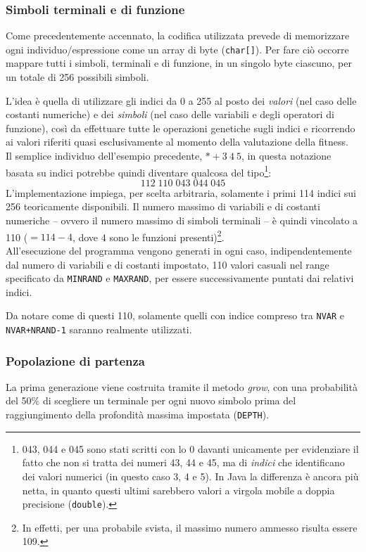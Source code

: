 \documentclass{../llncs}
\newcommand{\java}{\textsf{Java}\xspace}
\begin{document}
\subsubsection{Simboli terminali e di funzione}
Come precedentemente accennato, la codifica utilizzata prevede di memorizzare ogni individuo/espressione come un array di byte (\texttt{char[]}). Per fare ciò occorre mappare tutti i simboli, terminali e di funzione, in un singolo byte ciascuno, per un totale di 256 possibili simboli.

L'idea è quella di utilizzare gli indici da 0 a 255 al posto dei \emph{valori} (nel caso delle costanti numeriche) e dei \emph{simboli} (nel caso delle variabili e degli operatori di funzione), così da effettuare tutte le operazioni genetiche sugli indici e ricorrendo ai valori riferiti quasi esclusivamente al momento della valutazione della fitness.\\

Il semplice individuo dell'esempio precedente, $* + 3\:4\:5$, in questa notazione basata su indici potrebbe quindi diventare qualcosa del tipo\footnote{043, 044 e 045 sono stati scritti con lo 0 davanti unicamente per evidenziare il fatto che non si tratta dei numeri 43, 44 e 45, ma di \emph{indici} che identificano dei valori numerici (in questo caso 3, 4 e 5). In \java la differenza è ancora più netta, in quanto questi ultimi sarebbero valori a virgola mobile a doppia precisione (\texttt{double}).}:
\[
112\;110\;043\;044\;045
\]
L'implementazione impiega, per scelta arbitraria, solamente i primi 114 indici sui 256 teoricamente disponibili. Il numero massimo di variabili e di costanti numeriche -- ovvero il numero massimo di simboli terminali -- è quindi vincolato a 110 ($=114-4$, dove 4 sono le funzioni presenti)\footnote{In effetti, per una probabile svista, il massimo numero ammesso risulta essere 109.}.\\

All'esecuzione del programma vengono generati in ogni caso, indipendentemente dal numero di variabili e di costanti impostato, 110 valori casuali nel range specificato da \texttt{MINRAND} e \texttt{MAXRAND}, per essere successivamente puntati dai relativi indici.

Da notare come di questi 110, solamente quelli con indice compreso tra \texttt{NVAR} e \texttt{NVAR+NRAND-1} saranno realmente utilizzati.

\subsubsection{Popolazione di partenza}
La prima generazione viene costruita tramite il metodo \emph{grow}, con una probabilità del 50\% di scegliere un terminale per ogni nuovo simbolo prima del raggiungimento della profondità massima impostata (\texttt{DEPTH}).
\end{document}
